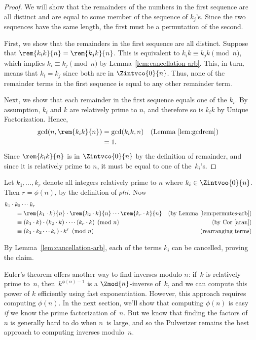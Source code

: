 \begin{proof}
We will show that the remainders of the numbers in the first sequence
are all distinct and are equal to some member of the sequence of
$k_j$'s.  Since the two sequences have the same length, the first must
be a permutation of the second.

First, we show that the remainders in the first sequence are all
distinct.  Suppose that $\rem{k_i k}{n} = \rem{k_j k}{n}$.  This is
equivalent to $k_i k \equiv k_j k \pmod{n}$, which implies $k_i \equiv
k_j \pmod{n}$ by Lemma~\ref{lem:cancellation-arb}.  This, in turn,
means that $k_i = k_j$ since both are in $\Zintvco{0}{n}$.  Thus, none
of the remainder terms in the first sequence is equal to any other
remainder term.

Next, we show that each remainder in the first sequence equals one of
the $k_i$.  By assumption, $k_i$ and $k$ are relatively prime to $n$,
and therefore so is $k_ik$ by Unique Factorization.  Hence,
\begin{align*}
\gcd(n, \rem{k_i k}{n}) & = \gcd(k_i k, n)
            & \text{(Lemma~\ref{lem:gcdrem})}\\
      & = 1.
\end{align*}
Since $\rem{k_i k}{n}$ is in $\Zintvco{0}{n}$ by the definition of remainder,
  and since it is relatively prime to $n$, it must be equal to one of
  the~$k_i$'s.
\end{proof}

Let $k_1, \dots, k_r$ denote all integers relatively prime to $n$
where $k_i \in \Zintvoo{0}{n}$.  Then $r = \phi(n)$, by the definition of
  $phi$.  Now
\begin{align*}
\lefteqn{k_1 \cdot k_2 \cdots k_r} \hspace{0.25in} \\
  & = \rem{k_1 \cdot k}{n} \cdot \rem{k_2 \cdot k}{n} \cdots \rem{k_r \cdot k}{n}
      & \text{(by Lemma~\ref{lem:permutes-arb})}\\
  & \equiv (k_1 \cdot k) \cdot (k_2 \cdot k) \cdot \cdots (k_r \cdot k) \pmod{n}
      & \text{(by Cor~\ref{aran})}\\
  & \equiv (k_1 \cdot k_2 \cdots k_r) \cdot k^r \pmod{n}
      & \text{(rearranging terms)}
\end{align*}

By Lemma~\ref{lem:cancellation-arb}, each of the terms $k_i$ can be
cancelled, proving the claim.
\fi

\medskip
Euler's theorem offers another way to find inverses modulo
$n$: if~$k$ is relatively prime to~$n$, then~$k^{\phi(n)-1}$ is a
$\Zmod{n}$-inverse of~$k$, and we can compute this power of $k$
efficiently using fast exponentiation.  However, this approach
requires computing $\phi(n)$.  In the next section, we'll show that
computing $\phi(n)$ is easy \emph{if} we know the prime factorization
of~$n$.  But we know that finding the factors of~$n$ is generally hard
to do when $n$~is large, and so the Pulverizer remains the best
approach to computing inverses modulo~$n$.

